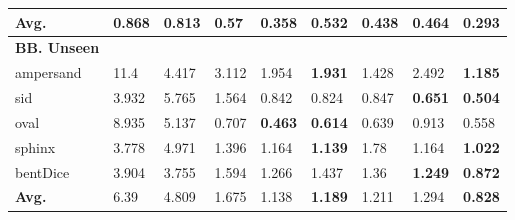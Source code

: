 \begin{table}[h]
{\begin{tabular}{C{2cm}|C{1.2cm}C{1.2cm}C{1.2cm}C{1.2cm}C{1.2cm}C{1.2cm}C{1.2cm}C{1.2cm}}
\textbf{Avg.} &  0.868 &  0.813 &  0.57 &  0.358 &  0.532 &  0.438 &  \textbf{0.464} &  \textbf{0.293} \\
    \midrule
    \midrule
\raggedright \textbf{BB. Unseen}  &  &  &  & \\
ampersand & 11.4 &  4.417 &  3.112 &  1.954 &  \textbf{1.931} &  1.428 &  2.492 &  \textbf{1.185} \\

 sid& 3.932 &  5.765 &  1.564 &  0.842 &  0.824 &  0.847 &  \textbf{0.651} &  \textbf{0.504} \\
 
oval& 8.935 &  5.137 &  0.707 &  \textbf{0.463} &  \textbf{0.614} &  0.639 &  0.913 &  0.558 \\
 
sphinx& 3.778 &  4.971 &  1.396 &  1.164 &  \textbf{1.139} &  1.78 &  1.164 &  \textbf{1.022} \\
 
bentDice& 3.904 &  3.755 &  1.594 &  1.266 &  1.437 &  1.36 &  \textbf{1.249} &  \textbf{0.872} \\
 
\textbf{Avg.} &  6.39 &  4.809 &  1.675 &  1.138 &  \textbf{1.189} &  1.211 &  1.294 &  \textbf{0.828} \\

    
        \bottomrule

    \end{tabular} 
    }
\end{table}



